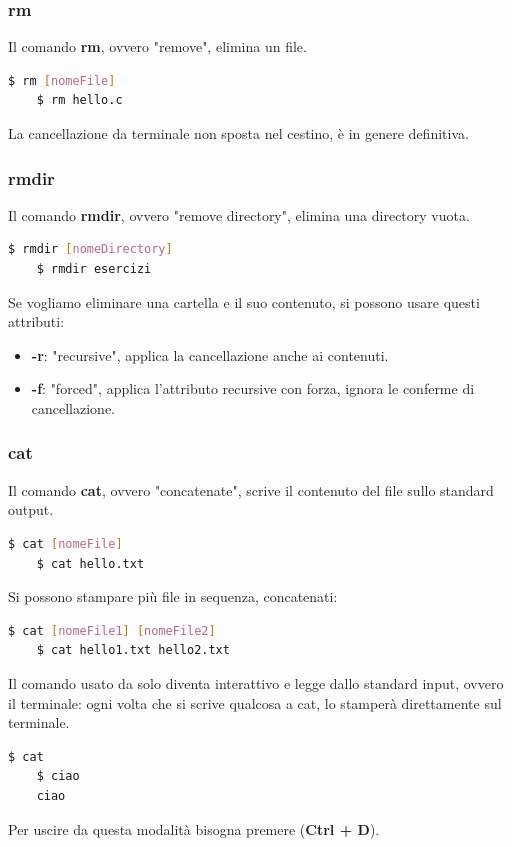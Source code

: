 \documentclass[12pt,a4paper]{article}
\begin{document}
\subsubsection{rm}
Il comando \textbf{rm}, ovvero "remove", elimina un file.
\begin{lstlisting}[language=bash]
    $ rm [nomeFile]
    $ rm hello.c
\end{lstlisting}
La cancellazione da terminale non sposta nel cestino, è in genere definitiva.
\subsubsection{rmdir}
Il comando \textbf{rmdir}, ovvero "remove directory", elimina una directory vuota.
\begin{lstlisting}[language=bash]
    $ rmdir [nomeDirectory]
    $ rmdir esercizi
\end{lstlisting}
Se vogliamo eliminare una cartella e il suo contenuto, si possono usare questi attributi:
\begin{itemize}
    \item \textbf{-r}: "recursive", applica la cancellazione anche ai contenuti.
    \item \textbf{-f}: "forced", applica l'attributo recursive con forza, ignora le conferme di cancellazione.
\end{itemize}
\subsubsection{cat}
Il comando \textbf{cat}, ovvero "concatenate", scrive il contenuto del file sullo standard output.
\begin{lstlisting}[language=bash]
    $ cat [nomeFile]
    $ cat hello.txt
\end{lstlisting}
Si possono stampare più file in sequenza, concatenati:
\begin{lstlisting}[language=bash]
    $ cat [nomeFile1] [nomeFile2]
    $ cat hello1.txt hello2.txt
\end{lstlisting}
Il comando usato da solo diventa interattivo e legge dallo standard input, ovvero il terminale: ogni volta che si scrive qualcosa a cat, lo stamperà direttamente sul terminale.
\begin{lstlisting}[language=bash]
    $ cat
    $ ciao
    ciao
\end{lstlisting}
Per uscire da questa modalità bisogna premere (\textbf{Ctrl + D}).
\end{document}
